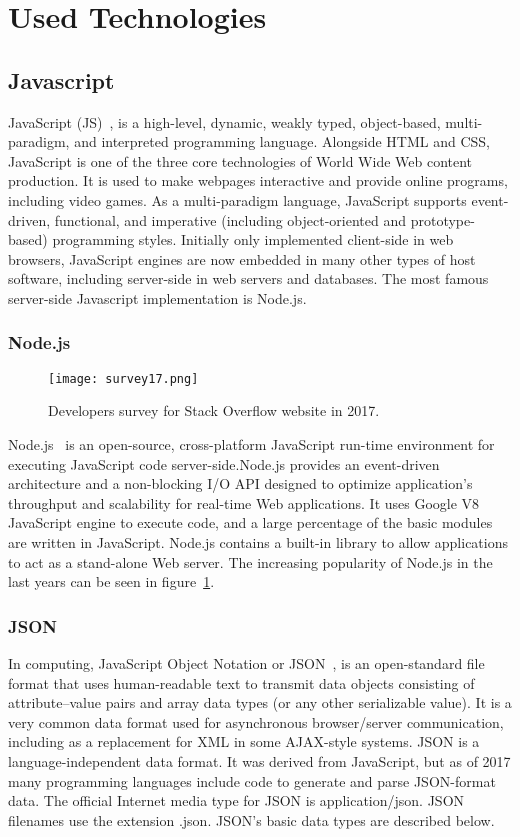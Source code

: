 \section{Used Technologies}

\subsection{Javascript}
JavaScript (JS)~\cite{crockford2008javascript}, is a high-level, dynamic, weakly typed, object-based, multi-paradigm, and interpreted programming language. Alongside HTML and CSS, JavaScript is one of the three core technologies of World Wide Web content production. It is used to make webpages interactive and provide online programs, including video games. As a multi-paradigm language, JavaScript supports event-driven, functional, and imperative (including object-oriented and prototype-based) programming styles. Initially only implemented client-side in web browsers, JavaScript engines are now embedded in many other types of host software, including server-side in web servers and databases. The most famous server-side Javascript implementation is Node.js.

\subsubsection{Node.js}
\begin{figure}
	\texttt{[image: survey17.png]}
	\caption{Developers survey for Stack Overflow website in 2017.}
	\label{survey17}
\end{figure}
Node.js~\cite{tilkov2010node} is an open-source, cross-platform JavaScript run-time environment for executing JavaScript code server-side.Node.js provides an event-driven architecture and a non-blocking I/O API designed to optimize application's throughput and scalability for real-time Web applications. It uses Google V8 JavaScript engine to execute code, and a large percentage of the basic modules are written in JavaScript. Node.js contains a built-in library to allow applications to act as a stand-alone Web server. The increasing popularity of Node.js in the last years can be seen in figure~\ref{survey17}.

\subsubsection{JSON}
\label{json}
In computing, JavaScript Object Notation or JSON~\cite{crockford2006application}, is an open-standard file format that uses human-readable text to transmit data objects consisting of attribute–value pairs and array data types (or any other serializable value). It is a very common data format used for asynchronous browser/server communication, including as a replacement for XML in some AJAX-style systems.
JSON is a language-independent data format. It was derived from JavaScript, but as of 2017 many programming languages include code to generate and parse JSON-format data. The official Internet media type for JSON is application/json. JSON filenames use the extension .json. JSON's basic data types are described below. \par
